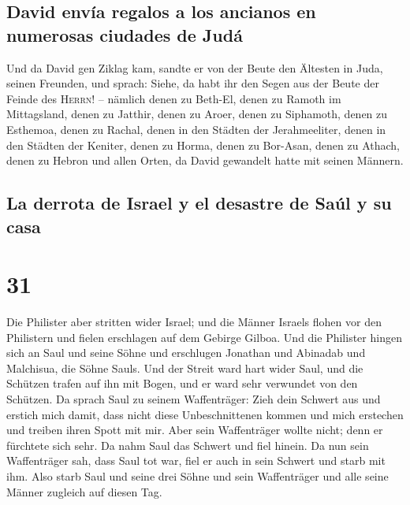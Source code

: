 \hypertarget{david-envuxeda-regalos-a-los-ancianos-en-numerosas-ciudades-de-juduxe1}{%
\subsection{David envía regalos a los ancianos en numerosas ciudades de
Judá}\label{david-envuxeda-regalos-a-los-ancianos-en-numerosas-ciudades-de-juduxe1}}

 Und da David gen Ziklag kam, sandte er von der Beute den
Ältesten in Juda, seinen Freunden, und sprach: Siehe, da habt ihr den
Segen aus der Beute der Feinde des \textsc{Herrn}! -- 
nämlich denen zu Beth-El, denen zu Ramoth im Mittagsland, denen zu
Jatthir,  denen zu Aroer, denen zu Siphamoth, denen zu
Esthemoa,  denen zu Rachal, denen in den Städten der
Jerahmeeliter, denen in den Städten der Keniter,  denen
zu Horma, denen zu Bor-Asan, denen zu Athach,  denen zu
Hebron und allen Orten, da David gewandelt hatte mit seinen Männern.

\hypertarget{la-derrota-de-israel-y-el-desastre-de-sauxfal-y-su-casa}{%
\subsection{La derrota de Israel y el desastre de Saúl y su
casa}\label{la-derrota-de-israel-y-el-desastre-de-sauxfal-y-su-casa}}

\hypertarget{section-30}{%
\section{31}\label{section-30}}

 Die Philister aber stritten wider Israel; und die Männer
Israels flohen vor den Philistern und fielen erschlagen auf dem Gebirge
Gilboa.  Und die Philister hingen sich an Saul und seine
Söhne und erschlugen Jonathan und Abinadab und Malchisua, die Söhne
Sauls.  Und der Streit ward hart wider Saul, und die
Schützen trafen auf ihn mit Bogen, und er ward sehr verwundet von den
Schützen.  Da sprach Saul zu seinem Waffenträger: Zieh
dein Schwert aus und erstich mich damit, dass nicht diese
Unbeschnittenen kommen und mich erstechen und treiben ihren Spott mit
mir. Aber sein Waffenträger wollte nicht; denn er fürchtete sich sehr.
Da nahm Saul das Schwert und fiel hinein.  Da nun sein
Waffenträger sah, dass Saul tot war, fiel er auch in sein Schwert und
starb mit ihm.  Also starb Saul und seine drei Söhne und
sein Waffenträger und alle seine Männer zugleich auf diesen Tag.

